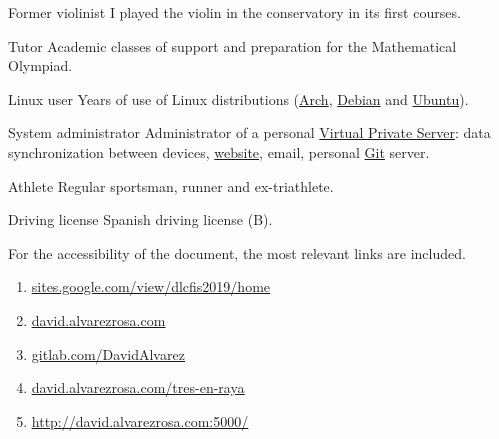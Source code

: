 

\cvachievement{\faMusic}
{Former violinist \smallskip}
{\small {}%
  \small{}}
I played the violin in the conservatory in its first courses.

\divider

\cvachievement{\faGroup}
{Tutor \smallskip}
{Academic classes of support and preparation for the Mathematical Olympiad.}

\divider

\cvachievement{\faLinux}
{Linux user \smallskip}
{Years of use of Linux distributions (\href{https://www.archlinux.org/}{Arch},
\href{https://www.debian.org/}{Debian} and \href{https://ubuntu.com/}{Ubuntu}).}

\divider

\cvachievement{\faServer}
{System administrator}
{Administrator of a personal
\href{https://en.wikipedia.org/wiki/Virtual_private_server}{Virtual Private
Server}: data synchronization between devices,
\href{https://david.alvarezrosa.com}{website\footnotemark}, email, personal
\href{https://en.wikipedia.org/wiki/Git}{Git} server.}

\divider

\cvachievement{\faHeartbeat}
{Athlete \smallskip}
{Regular sportsman, runner and ex-triathlete.}

\divider

\cvachievement{\faCar}
{Driving license \smallskip}
{\small {}%
  \small{}}
Spanish driving license (B).


\medskip

For the accessibility of the document, the most relevant links are included. \\[1.25ex]
\begin{enumerate}
  \item \href{https://sites.google.com/view/dlcfis2019/home}
  {\underline{sites.google.com/view/dlcfis2019/home}}
  \item \href{https://david.alvarezrosa.com}{\underline{david.alvarezrosa.com}}
  \item \href{https://gitlab.com/DavidAlvarez}
  {\underline{gitlab.com/DavidAlvarez}}
  \item \href{https://david.alvarezrosa.com/tres-en-raya}
  {\underline{david.alvarezrosa.com/tres-en-raya}}
  \item \href{http://david.alvarezrosa.com:5000/}
  {\underline{http://david.alvarezrosa.com:5000/}}
\end{enumerate}
